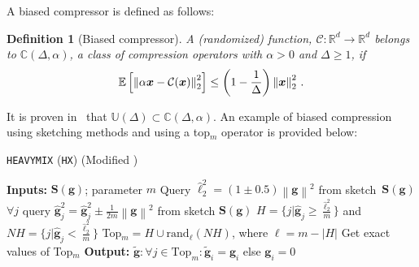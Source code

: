 \documentclass[sigconf, anonymous, review]{acmart}
\newtheorem{lemma}{Lemma}
\newtheorem{definition}{Definition}
\begin{document}
A biased compressor is defined as follows:
\begin{definition}[Biased compressor]
A (randomized) function,  ${\mathcal{C}}:\mathbb{R}^{d}\rightarrow\mathbb{R}^{d}$ belongs to $\mathbb{C}(\Delta,\alpha)$, a class of compression operators with $\alpha>0$ and $\Delta\geq 1$, if
\begin{align}\notag
    \mathbb{E}\left[\left\|\alpha\boldsymbol{x}-{\mathcal{C}}(\boldsymbol{x})\right\|^2_2\right]\leq \left(1-\frac{1}{\Delta}\right)\left\|\boldsymbol{x}\right\|^2_2\, .
\end{align}
\end{definition}
It is proven in~\cite{horvath2020better} that $\mathbb{U}(\Delta)\subset\mathbb{C}(\Delta, \alpha)$.
An example of biased compression using sketching methods and using a top$_m$ operator is provided below:
\begin{algorithm}[H]
\caption{\texttt{HEAVYMIX} (\texttt{HX}) (Modified \citep{ivkin2019communication})}\label{alg:heavymix}
\begin{algorithmic}[1]
\STATE \textbf{Inputs:} $\mathbf{S}({\mathbf{g}})$; parameter $m$
\STATE Query $\hat{\ell}_2^2=\left(1\pm 0.5\right)\left\|\mathbf{g}\right\|^2$ from sketch~$\mathbf{S}(\mathbf{g})$
\STATE $\forall j$ query $\hat{\mathbf{g}}_j^2=\hat{\mathbf{g}}_j^2\pm \frac{1}{2m}\left\|\mathbf{g}\right\|^2$ from sketch $\mathbf{S}(\mathbf{g})$
\STATE $H=\{j|\hat{\mathbf{g}}_j\geq \frac{\hat{\ell}_2^2}{m}\}$ and $NH=\{j|\hat{\mathbf{g}}_j<\frac{\hat{\ell}_2^2}{m}\}$
\STATE Top$_m=H\cup \text{rand}_\ell(NH)$, where $\ell=m-\left|H\right|$
\STATE Get exact values of Top$_m$ 
\STATE \textbf{Output:} $\tilde{\mathbf{g}}:\forall j\in\text{Top}_m:\tilde{\mathbf{g}}_{i}=\mathbf{g}_{i}$ else $ \mathbf{g}_{i}=0$
\end{algorithmic}
\end{algorithm}
\end{document}
